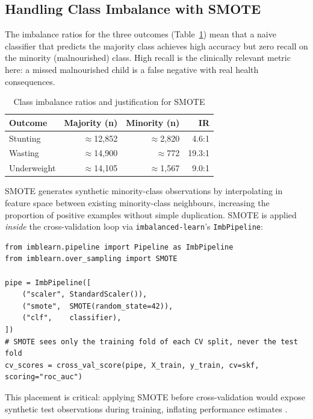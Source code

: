 \documentclass[12pt, a4paper]{article}
\begin{document}
\subsection{Handling Class Imbalance with SMOTE}
\label{sec:smote}

The imbalance ratios for the three outcomes (Table~\ref{tab:imbalance})
mean that a naive classifier that predicts the majority class achieves
high accuracy but zero recall on the minority (malnourished) class. High
recall is the clinically relevant metric here: a missed malnourished
child is a false negative with real health consequences.

\begin{table}[H]
\centering
\caption{Class imbalance ratios and justification for SMOTE}
\label{tab:imbalance}
\begin{tabular}{lrrr}
\toprule
\textbf{Outcome} & \textbf{Majority (n)} & \textbf{Minority (n)} & \textbf{IR} \\
\midrule
Stunting     & $\approx$12,852 & $\approx$2,820 & 4.6:1 \\
Wasting      & $\approx$14,900 & $\approx$772   & 19.3:1 \\
Underweight  & $\approx$14,105 & $\approx$1,567 & 9.0:1 \\
\bottomrule
\end{tabular}
\end{table}

SMOTE \citep{Chawla2002} generates synthetic minority-class observations
by interpolating in feature space between existing minority-class
neighbours, increasing the proportion of positive examples without
simple duplication. SMOTE is applied \emph{inside} the cross-validation
loop via \texttt{imbalanced-learn}'s \texttt{ImbPipeline}:

\begin{lstlisting}[caption={SMOTE inside cross-validation — prevents data leakage}]
from imblearn.pipeline import Pipeline as ImbPipeline
from imblearn.over_sampling import SMOTE

pipe = ImbPipeline([
    ("scaler", StandardScaler()),
    ("smote",  SMOTE(random_state=42)),
    ("clf",    classifier),
])
# SMOTE sees only the training fold of each CV split, never the test fold
cv_scores = cross_val_score(pipe, X_train, y_train, cv=skf, scoring="roc_auc")
\end{lstlisting}

This placement is critical: applying SMOTE before cross-validation would
expose synthetic test observations during training, inflating performance
estimates \citep{Blagus2013}.
\end{document}
